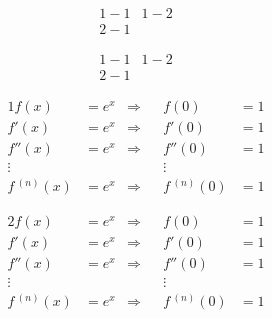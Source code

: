 \documentclass[oneside]{book}
\begin{document}
\pagestyle{empty}

%
%
%
%




\begin{align*}1-1&1-2\\2-1\end{align*} %

\begin{align*}1-1&1-2\\2-1&\end{align*} %

\begin{align*}
1f(x)&=e^x & \Rightarrow && f(0)&=1 \\
f'(x)&=e^x & \Rightarrow && f'(0)&=1 \\
f''(x)&=e^x & \Rightarrow && f''(0)&=1 \\
\vdots &&&& \vdots & \\
f\,^{(n)}(x)&=e^x & \Rightarrow && f\,^{(n)}(0)&=1
\end{align*}

\begin{align*}
2f(x)&=e^x & \Rightarrow && f(0)&=1 \\
f'(x)&=e^x & \Rightarrow && f'(0)&=1 \\
f''(x)&=e^x & \Rightarrow && f''(0)&=1 \\
\vdots &\,&\,&& \vdots & \\
f\,^{(n)}(x)&=e^x & \Rightarrow && f\,^{(n)}(0)&=1
\end{align*}
\end{document}
